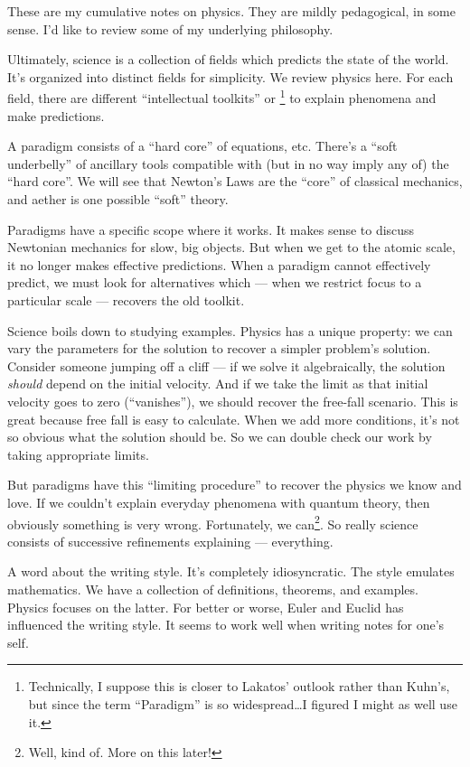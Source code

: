 
\M
These are my cumulative notes on physics. They are mildly pedagogical,
in some sense. I'd like to review some of my underlying philosophy.

Ultimately, science is a collection of fields which predicts the state
of the world. It's organized into distinct fields for simplicity. We
review physics here. For each field, there are different ``intellectual
toolkits'' or \footnote{Technically, I suppose this is
closer to Lakatos' outlook rather than Kuhn's, but since the term
``Paradigm'' is so widespread\dots I figured I might as well use it.}
to explain phenomena and make predictions.

\M A paradigm consists of a ``hard core'' of equations, etc. There's a
``soft underbelly'' of ancillary tools compatible with (but in no way
imply any of) the ``hard core''. We will see that Newton's Laws are the
``core'' of classical mechanics, and aether is one possible ``soft''
theory.

Paradigms have a specific scope where it works. It makes sense to
discuss Newtonian mechanics for slow, big objects. But when we get to
the atomic scale, it no longer makes effective predictions. When a
paradigm cannot effectively predict, we must look for alternatives which
--- when we restrict focus to a particular scale --- recovers the old
toolkit.

\M Science boils down to studying examples. Physics has a unique
property: we can vary the parameters for the solution to recover a
simpler problem's solution. Consider someone jumping off a cliff --- if
we solve it algebraically, the solution \emph{should} depend on the
initial velocity. And if we take the limit as that initial velocity goes
to zero (``vanishes''), we should recover the free-fall scenario. This
is great because free fall is easy to calculate. When we add more
conditions, it's not so obvious what the solution should be. So we can
double check our work by taking appropriate limits.

But paradigms have this ``limiting procedure'' to recover the physics we
know and love. If we couldn't explain everyday phenomena with quantum
theory, then obviously something is very wrong. Fortunately, we
can\footnote{Well, kind of. More on this later!}. So really science
consists of successive refinements explaining --- everything.

\M A word about the writing style. It's completely
idiosyncratic. The style emulates mathematics. We have a collection of
definitions, theorems, and examples. Physics focuses on the latter. For
better or worse, Euler and Euclid has influenced the writing style. It
seems to work well when writing notes for one's self.

